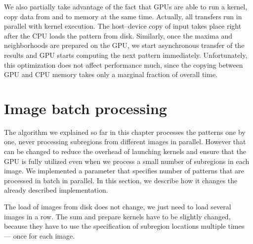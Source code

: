 We also partially take advantage of the fact that GPUs are able to run a kernel, copy data from and to memory at the same time. Actually, all transfers run in parallel with kernel execution. The host--device copy of input takes place right after the CPU loads the pattern from disk. Similarly, once the maxima and neighborhoods are prepared on the GPU, we start asynchronous transfer of the results and GPU starts computing the next pattern immediately. Unfortunately, this optimization does not affect performance much, since the copying between GPU and CPU memory takes only a marginal fraction of overall time.

\section{Image batch processing}
\label{batch-param}

The algorithm we explained so far in this chapter processes the patterns one by one, never processing subregions from different images in parallel. However that can be changed to reduce the overhead of launching kernels and ensure that the GPU is fully utilized even when we process a small number of subregions in each image. We implemented a parameter that specifies number of patterns that are processed in batch in parallel. In this section, we describe how it changes the already described implementation.

The load of images from disk does not change, we just need to load several images in a row. The sum and prepare kernels have to be slightly changed, because they have to use the specification of subregion locations multiple times --- once for each image.





